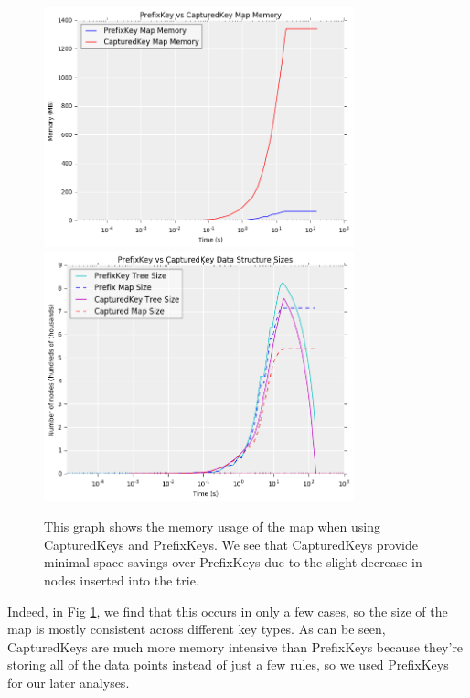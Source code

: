 \begin{figure}[t!]
	\begin{center}
	\includegraphics[width=0.8\textwidth]{figs/prefix-captured_pmap_mem.png}
	\includegraphics[width=0.8\textwidth]{figs/prefix-captured_tree_size.png}
	\caption{This graph shows the memory usage of the map when using CapturedKeys and PrefixKeys. 
We see that CapturedKeys provide minimal space savings over PrefixKeys due to the slight decrease in nodes inserted into the trie.}
	\end{center}
\label{fig:prefix-captured}
\end{figure}

Indeed, in Fig \ref{fig:prefix-captured}, we find that this occurs in only a few cases, so the size of the map is mostly consistent across different key types.
As can be seen, CapturedKeys are much more memory intensive than PrefixKeys because they're storing all of the data points instead of just a few rules, so we used PrefixKeys for our later analyses.

